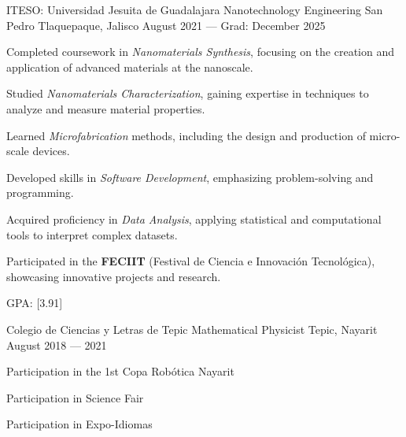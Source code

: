\begin{cventries}
  \cventry
  {ITESO\@: Universidad Jesuita de Guadalajara}
  {Nanotechnology Engineering}
  {San Pedro Tlaquepaque, Jalisco}
  {August 2021 --- Grad: December 2025}
  {
    \begin{cvitems}
      \item {Completed coursework in \textit{Nanomaterials Synthesis}, focusing on the creation and application of advanced materials at the nanoscale.}
      \item {Studied \textit{Nanomaterials Characterization}, gaining expertise in techniques to analyze and measure material properties.}
      \item {Learned \textit{Microfabrication} methods, including the design and production of micro-scale devices.}
      \item {Developed skills in \textit{Software Development}, emphasizing problem-solving and programming.}
      \item {Acquired proficiency in \textit{Data Analysis}, applying statistical and computational tools to interpret complex datasets.}
      \item {Participated in the \textbf{FECIIT} (Festival de Ciencia e Innovación Tecnológica), showcasing innovative projects and research.}
      \item {GPA: [3.91]} %
    \end{cvitems}
  }

  \cventry
  {Colegio de Ciencias y Letras de Tepic}
  {Mathematical Physicist}
  {Tepic, Nayarit}
  {August 2018 --- 2021}
  {
    \begin{cvitems}
      \item {Participation in the 1st Copa Robótica Nayarit}
      \item {Participation in Science Fair}
      \item {Participation in Expo-Idiomas}
    \end{cvitems}
  }
\end{cventries}